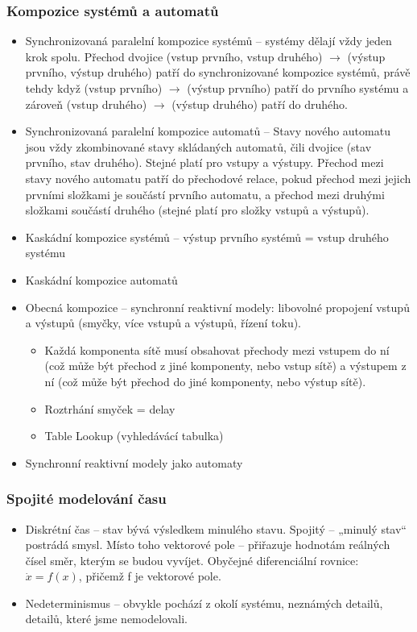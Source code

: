 \documentclass[a4paper,hidelinks]{article}
\begin{document}
\subsubsection*{Kompozice systémů a automatů}

\begin{itemize}
    \item Synchronizovaná paralelní kompozice systémů -- systémy dělají vždy jeden krok spolu. Přechod dvojice (vstup prvního, vstup druhého) $\to$ (výstup prvního, výstup druhého) patří do synchronizované kompozice systémů, právě tehdy když (vstup prvního) $\to$ (výstup prvního) patří do prvního systému a zároveň (vstup druhého) $\to$ (výstup druhého) patří do druhého.
    \item Synchronizovaná paralelní kompozice automatů -- Stavy nového automatu jsou vždy zkombinované stavy skládaných automatů, čili dvojice (stav prvního, stav druhého). Stejné platí pro vstupy a výstupy. Přechod mezi stavy nového automatu patří do přechodové relace, pokud přechod mezi jejich prvními složkami je součástí prvního automatu, a přechod mezi druhými složkami součástí druhého (stejné platí pro složky vstupů a výstupů).
    \item Kaskádní kompozice systémů -- výstup prvního systémů = vstup druhého systému
    \item Kaskádní kompozice automatů
    \item Obecná kompozice -- synchronní reaktivní modely: libovolné propojení vstupů a výstupů (smyčky, více vstupů a výstupů, řízení toku). 
    \begin{itemize}
        \item Každá komponenta sítě musí obsahovat přechody mezi vstupem do ní (což může být přechod z jiné komponenty, nebo vstup sítě) a výstupem z ní (což může být přechod do jiné komponenty, nebo výstup sítě).
        \item Roztrhání smyček = delay
        \item Table Lookup (vyhledávácí tabulka)
    \end{itemize}
    \item Synchronní reaktivní modely jako automaty
\end{itemize}

\subsubsection*{Spojité modelování času}

\begin{itemize}
    \item Diskrétní čas -- stav bývá výsledkem minulého stavu. Spojitý -- „minulý stav“ postrádá smysl. Místo toho vektorové pole -- přiřazuje hodnotám reálných čísel směr, kterým se budou vyvíjet. Obyčejné diferenciální rovnice: $\dot{x} = f(x)$, přičemž f je vektorové pole.
    \item Nedeterminismus -- obvykle pochází z okolí systému, neznámých detailů, detailů, které jsme nemodelovali.
\end{itemize}
\end{document}
